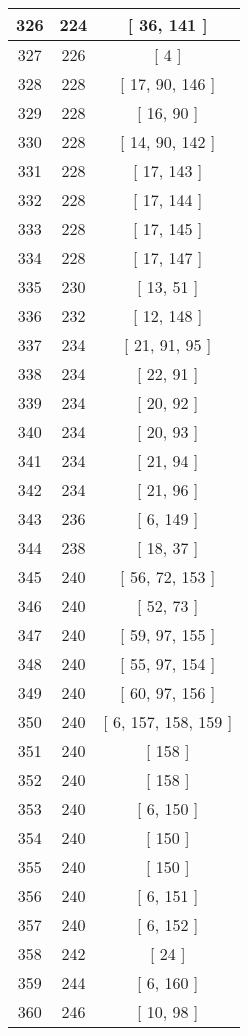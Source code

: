 \begin{center}
\begin{longtable}[H]{|| c c c ||}
\hline
326 & 224 & [ 36, 141 ] \\ 
\hline
327 & 226 & [ 4 ] \\ 
\hline
328 & 228 & [ 17, 90, 146 ] \\ 
\hline
329 & 228 & [ 16, 90 ] \\ 
\hline
330 & 228 & [ 14, 90, 142 ] \\ 
\hline
331 & 228 & [ 17, 143 ] \\ 
\hline
332 & 228 & [ 17, 144 ] \\ 
\hline
333 & 228 & [ 17, 145 ] \\ 
\hline
334 & 228 & [ 17, 147 ] \\ 
\hline
335 & 230 & [ 13, 51 ] \\ 
\hline
336 & 232 & [ 12, 148 ] \\ 
\hline
337 & 234 & [ 21, 91, 95 ] \\ 
\hline
338 & 234 & [ 22, 91 ] \\ 
\hline
339 & 234 & [ 20, 92 ] \\ 
\hline
340 & 234 & [ 20, 93 ] \\ 
\hline
341 & 234 & [ 21, 94 ] \\ 
\hline
342 & 234 & [ 21, 96 ] \\ 
\hline
343 & 236 & [ 6, 149 ] \\ 
\hline
344 & 238 & [ 18, 37 ] \\ 
\hline
345 & 240 & [ 56, 72, 153 ] \\ 
\hline
346 & 240 & [ 52, 73 ] \\ 
\hline
347 & 240 & [ 59, 97, 155 ] \\ 
\hline
348 & 240 & [ 55, 97, 154 ] \\ 
\hline
349 & 240 & [ 60, 97, 156 ] \\ 
\hline
350 & 240 & [ 6, 157, 158, 159 ] \\ 
\hline
351 & 240 & [ 158 ] \\ 
\hline
352 & 240 & [ 158 ] \\ 
\hline
353 & 240 & [ 6, 150 ] \\ 
\hline
354 & 240 & [ 150 ] \\ 
\hline
355 & 240 & [ 150 ] \\ 
\hline
356 & 240 & [ 6, 151 ] \\ 
\hline
357 & 240 & [ 6, 152 ] \\ 
\hline
358 & 242 & [ 24 ] \\ 
\hline
359 & 244 & [ 6, 160 ] \\ 
\hline
360 & 246 & [ 10, 98 ] \\ 

\end{longtable}
\end{center}
